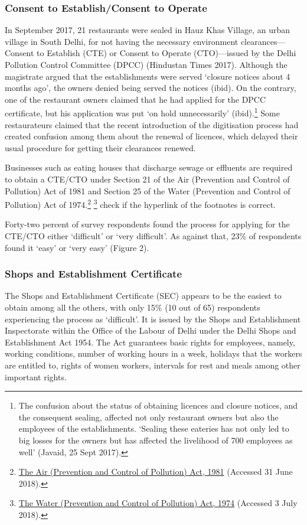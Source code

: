 \documentclass[a4paper, 12pt]{article}
\begin{document}
                   \subsubsection{Consent to Establish/Consent to Operate}
                   In September 2017, 21 restaurants were sealed in Hauz Khas Village, an urban village in South Delhi, for not having the necessary environment clearances—Consent to Establish (CTE) or Consent to Operate (CTO)—issued by the Delhi Pollution 
Control Committee (DPCC) (Hindustan Times 2017). Although the magistrate argued that the establishments were served ‘closure notices about 4 months ago’, the owners denied being served the notices (ibid). On the contrary, one of the restaurant owners 
claimed that he had applied for the DPCC certificate, but his application was put ‘on hold unnecessarily’ (ibid).\footnote{The confusion about the status of obtaining licences and closure notices, and the consequent sealing, affected not only restaurant owners but 
also the employees of the establishments. ‘Sealing these eateries has not only led to big losses for the owners but has affected the livelihood of 700 employees as well’ (Javaid, 25 Sept 2017).} Some restaurateurs claimed that the recent introduction of the 
digitisation process had created confusion among them about the renewal of licences, which delayed their usual procedure for getting their clearances renewed.%
                   
                   Businesses such as eating houses that discharge sewage or effluents are required to obtain a CTE/CTO under Section 21 of the Air (Prevention and Control of Pollution) Act of 1981 and Section 25 of the Water (Prevention and Control of Pollution) Act 
of 1974.\footnote{\href{https://bit.ly/2pbaWOw}{The Air (Prevention and Control of Pollution) Act, 1981} (Accessed 31 June 2018).} \footnote{\href{https://bit.ly/2xcUyRW}{The Water (Prevention and Control of Pollution) Act, 1974} (Accessed 3 July 2018).}  %
check if the hyperlink of the footnotes is correct. 
                   
                   Forty-two percent of survey respondents found the process for applying for the CTE/CTO either ‘difficult’ or ‘very difficult’. As against that, 23\% of respondents found it ‘easy’ or ‘very easy’ (Figure 2).
                          
                   \subsubsection{Shops and Establishment Certificate}
                   The Shops and Establishment Certificate (SEC) appears to be the easiest to obtain among all the others, with only 15\% (10 out of 65) respondents experiencing the process as ‘difficult’. It is issued by the Shops and Establishment Inspectorate within the Office of the Labour of Delhi under the Delhi Shops and Establishment Act 1954. The Act guarantees basic rights for employees, namely, working conditions, number of working hours in a week, holidays that the workers are entitled to, rights of women workers, intervals for rest and meals among other important rights.
         
\end{document}
